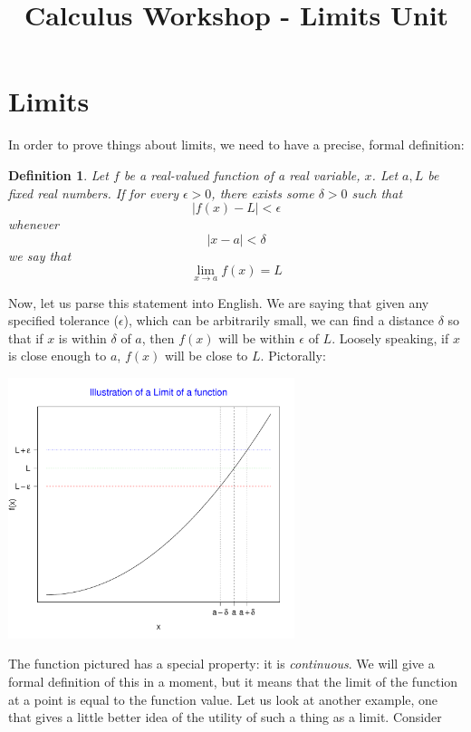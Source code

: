 \documentclass[12pt,a4paper]{article} %
\title{Calculus Workshop - Limits Unit}
\newtheorem{defn}{Definition}
\begin{document}
\maketitle

\section{Limits} 
In order to prove things about limits, we need to have a precise, formal definition:
\begin{defn}
Let $f$ be a real-valued function of a real variable, $x$.  Let $a,L$ be fixed real numbers.  If for every $\epsilon >0$, there exists some $\delta>0$ such that
\begin{equation*}
|f(x) - L|<\epsilon 
\end{equation*}
whenever
\begin{equation*}
|x - a|<\delta 
\end{equation*}
we say that
\begin{equation*}
\lim_{x\rightarrow a} f(x) = L
\end{equation*}
\end{defn}
Now, let us parse this statement into English.  We are saying that given any specified tolerance ($\epsilon$), which can be arbitrarily small, we can find a distance $\delta$ so that if $x$ is within $\delta$ of $a$, then $f(x)$ will be within $\epsilon$ of $L$.  Loosely speaking, if $x$ is close enough to $a$, $f(x)$ will be close to $L$.  Pictorally:

\includegraphics[height=3in]{limit.pdf}

The function pictured has a special property: it is \emph{continuous}.  We will give a formal definition of this in a moment, but it means that the limit of the function at a point is equal to the function value.  Let us look at another example, one that gives a little better idea of the utility of such a thing as a limit.  Consider\\
\end{document}
